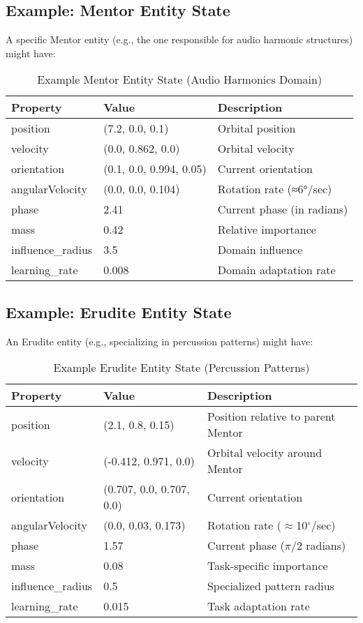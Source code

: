 \subsection{Example: Mentor Entity State}

A specific Mentor entity (e.g., the one responsible for audio harmonic structures) might have:

\begin{table}[h]
\centering
\begin{tabular}{|l|l|l|}
\hline
\textbf{Property} & \textbf{Value} & \textbf{Description} \\
\hline
position & (7.2, 0.0, 0.1) & Orbital position \\
velocity & (0.0, 0.862, 0.0) & Orbital velocity \\
orientation & (0.1, 0.0, 0.994, 0.05) & Current orientation \\
angularVelocity & (0.0, 0.0, 0.104) & Rotation rate (≈6°/sec) \\
phase & 2.41 & Current phase (in radians) \\
mass & 0.42 & Relative importance \\
influence\_radius & 3.5 & Domain influence \\
learning\_rate & 0.008 & Domain adaptation rate \\
\hline
\end{tabular}
\caption{Example Mentor Entity State (Audio Harmonics Domain)}
\end{table}

\subsection{Example: Erudite Entity State}

An Erudite entity (e.g., specializing in percussion patterns) might have:

\begin{table}[h]
\centering
\begin{tabular}{|l|l|l|}
\hline
\textbf{Property} & \textbf{Value} & \textbf{Description} \\
\hline
position & (2.1, 0.8, 0.15) & Position relative to parent Mentor \\
velocity & (-0.412, 0.971, 0.0) & Orbital velocity around Mentor \\
orientation & (0.707, 0.0, 0.707, 0.0) & Current orientation \\
angularVelocity & (0.0, 0.03, 0.173) & Rotation rate ($\approx$10$^{\circ}$/sec) \\
phase & 1.57 & Current phase ($\pi$/2 radians) \\
mass & 0.08 & Task-specific importance \\
influence\_radius & 0.5 & Specialized pattern radius \\
learning\_rate & 0.015 & Task adaptation rate \\
\hline
\end{tabular}
\caption{Example Erudite Entity State (Percussion Patterns)}
\end{table}

